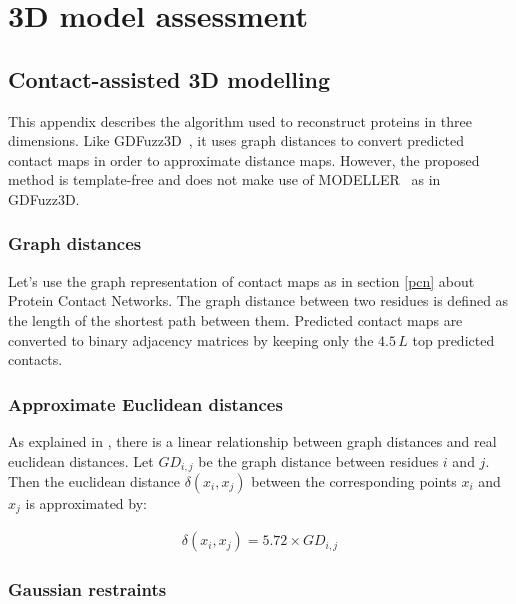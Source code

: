 \chapter{3D model assessment}

    \section{Contact-assisted 3D modelling}

    This appendix describes the algorithm used to reconstruct
    proteins in three dimensions. Like GDFuzz3D~\cite{pietal2015gdfuzz3d},
    it uses graph distances to convert predicted contact maps
    in order to approximate distance maps. However, the proposed method is template-free
    and does not make use of MODELLER~\cite{modeller} as in GDFuzz3D.

    \subsection{Graph distances}

        Let's use the graph representation of contact maps as in section \ref{pcn}
        about Protein Contact Networks.
        The graph distance between two residues is defined as the length of
        the shortest path between them.
        Predicted contact maps are converted to binary adjacency matrices
        by keeping only the $4.5\,L$ top predicted contacts.

    \subsection{Approximate Euclidean distances}

        As explained in \cite{pietal2015gdfuzz3d}, there is a linear relationship
        between graph distances and real euclidean distances.
        Let $GD_{i,j}$ be the graph distance between residues $i$ and $j$. Then
        the euclidean distance $\delta(x_i, x_j)$ between the corresponding
        points $x_i$ and $x_j$ is approximated by:

        \begin{align}
            \delta(x_i, x_j) = 5.72 \times GD_{i,j}
        \end{align}

    \subsection{Gaussian restraints}

